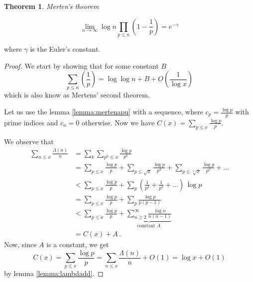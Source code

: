 \documentclass{article}
\theoremstyle{definition}
\newtheorem{theorem}[subsection]{Theorem}
\begin{document}
\begin{theorem}{\emph{Merten's theorem}}

\begin{equation*}
    \lim_{n \rightarrow \infty} \log n \prod_{p\leq n} \left(1-\frac{1}{p}\right) = e^{-\gamma}
\end{equation*}

where $\gamma$ is the Euler's constant.

\begin{proof}

We start by showing that for some constant $B$
\begin{equation*}
    \sum_{p\leq n}\left(\frac{1}{p}\right) = \log\log n + B + O\left(\frac{1}{\log x}\right)
\end{equation*}
which is also know as Mertens' second theorem.

Let us use the lemma \ref{lemma:mertenapu} with a sequence, where $c_p=\frac{\log p}{p}$ with prime indices and $c_n=0$ otherwise. Now we have $C(x) = \sum_{p\leq x} \frac{\log p}{p}$.

We observe that
\begin{align*}
    \sum_{n\leq x} \frac{\Lambda(n)}{n} & = \sum_k \sum_{p^k\leq x} \frac{\log p}{p^k}\\
    & = \sum_{p\leq x} \frac{\log p}{p} + \sum_{p\leq \sqrt{x}} \frac{\log p}{p^2} + \sum_{p\leq \sqrt[3]{x}} \frac{\log p}{p^3} + \dots\\
    & < \sum_{p\leq x} \frac{\log p}{p} + \sum_p \left(\frac{1}{p^2}+\frac{1}{p^3}+\dots\right)\,\log p\\
    & = \sum_{p\leq x} \frac{\log p}{p} + \sum_p \frac{\log p}{p(p-1)}\\
    & < \sum_{p\leq x} \frac{\log p}{p} + \underbrace{ \sum_{n\geq2}^\infty \frac{\log n}{n(n-1)}}_\text{constant $A$}\\
    & = C(x) + A\,.
\end{align*}
Now, since $A$ is a constant, we get
\begin{equation*}
    C(x) = \sum_{p\leq x} \frac{\log p}{p} = \sum_{n\leq x} \frac{\Lambda(n)}{n} + O(1) = \log x + O(1)
\end{equation*}
by lemma \ref{lemma:lambdadd}.


\end{proof}
\end{theorem}
\end{document}
